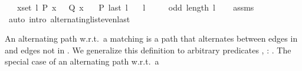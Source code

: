 \begin{isabellebody}
\ \ \ {\isachardoublequoteopen}{\isasymforall}x{\isasymin}set\ l{\isachardot}{\kern0pt}\ P\ x\ {\isasymlongleftrightarrow}\ {\isasymnot}\ Q\ x{\isachardoublequoteclose}\isanewline
\ \ \ {\isachardoublequoteopen}P\ {\isacharparenleft}{\kern0pt}last\ l{\isacharparenright}{\kern0pt}{\isachardoublequoteclose}\isanewline
\ \ \ {\isachardoublequoteopen}l\ {\isasymnoteq}\ {\isacharbrackleft}{\kern0pt}{\isacharbrackright}{\kern0pt}{\isachardoublequoteclose}\isanewline
\ \ \ {\isachardoublequoteopen}odd\ {\isacharparenleft}{\kern0pt}length\ l{\isacharparenright}{\kern0pt}{\isachardoublequoteclose}%
\endisataginvisible
{\isafoldinvisible}%
%
\isadeliminvisible
\isanewline
%
\endisadeliminvisible
%
\isadelimproof
\ \ %
\endisadelimproof
%
\isatagproof
{}\isamarkupfalse%
\ assms\isanewline
\ \ \isamarkupfalse%
\ {\isacharparenleft}{\kern0pt}auto\ intro{\isacharcolon}{\kern0pt}\ alternating{\isacharunderscore}{\kern0pt}list{\isacharunderscore}{\kern0pt}even{\isacharunderscore}{\kern0pt}last{\isacharparenright}{\kern0pt}%
\endisatagproof
{\isafoldproof}%
%
\isadelimproof
%
\endisadelimproof
%
\begin{isamarkuptext}%
An alternating path w.r.t.\ a matching  is a path that alternates between edges in
 and edges not in . We generalize this definition to arbitrary predicates
, : . The special case of an alternating path w.r.t.\ a

\end{isamarkuptext}
\end{isabellebody}
